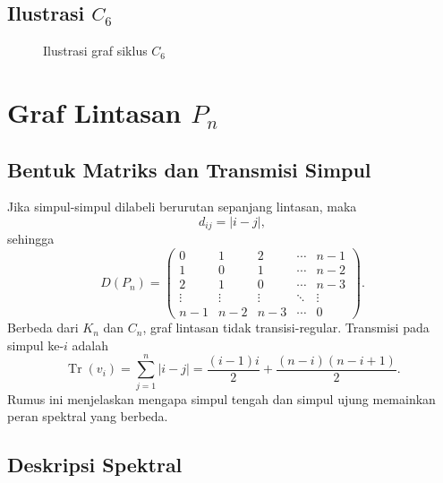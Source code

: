 \documentclass[12pt,a4paper]{article}
\begin{document}
\subsection{Ilustrasi $C_6$}

\begin{figure}[h!]
  \centering
  \caption{Ilustrasi graf siklus $C_6$}
  \label{fig:c6}
\end{figure}

\section{Graf Lintasan $P_n$}

\subsection{Bentuk Matriks dan Transmisi Simpul}

Jika simpul-simpul dilabeli berurutan sepanjang lintasan, maka
\[
  d_{ij}=|i-j|,
\]
sehingga
\[
  D(P_n)=
  \begin{pmatrix}
    0      & 1      & 2      & \cdots & n-1    \\
    1      & 0      & 1      & \cdots & n-2    \\
    2      & 1      & 0      & \cdots & n-3    \\
    \vdots & \vdots & \vdots & \ddots & \vdots \\
    n-1    & n-2    & n-3    & \cdots & 0
  \end{pmatrix}.
\]
Berbeda dari $K_n$ dan $C_n$, graf lintasan tidak transisi-regular. Transmisi pada simpul ke-$i$ adalah
\[
  \operatorname{Tr}(v_i)
  =
  \sum_{j=1}^n |i-j|
  =
  \frac{(i-1)i}{2}+\frac{(n-i)(n-i+1)}{2}.
\]
Rumus ini menjelaskan mengapa simpul tengah dan simpul ujung memainkan peran spektral yang berbeda.

\subsection{Deskripsi Spektral}
\end{document}
